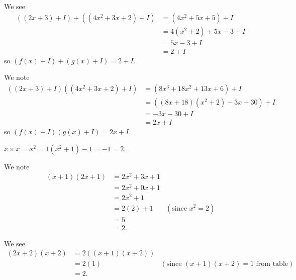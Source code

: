 \begin{questions}
\begin{partquestions}{\roman*}
        \item \begin{partquestions}{\alph*}
            \item We see
            \begin{align*}
                \left((2x+3) + I\right) + \left((4x^2+3x+2) + I\right) &= (4x^2+5x+5) + I\\
                &= 4(x^2+2) + 5x - 3 + I\\
                &= 5x - 3 + I\\
                &= 2 + I
            \end{align*}
            so $(f(x) + I) + (g(x) + I) = 2 + I$.

            \item We note
            \begin{align*}
                ((2x+3) + I)((4x^2+3x+2) + I) &= (8 x^3 + 18 x^2 + 13 x + 6) + I\\
                &= \left((8x + 18)(x^2+2) - 3x - 30\right) + I\\
                &= -3x - 30 + I\\
                &= 2x + I
            \end{align*}
            so $(f(x) + I)(g(x) + I) = 2x + I$.
        \end{partquestions}
    \end{partquestions}

    \item \begin{partquestions}{\alph*}
        \item $x \times x = x^2 = 1(x^2+1) - 1 = -1 = 2$.

        \item We note
        \begin{align*}
            (x+1)(2x+1) &= 2x^2 + 3x + 1\\
            &= 2x^2 + 0x + 1\\
            &= 2x^2 + 1\\
            &= 2(2) + 1 & (\text{since } x^2 = 2)\\
            &= 5\\
            &= 2.
        \end{align*}

        \item We see
        \begin{align*}
            (2x+2)(x+2) &= 2\left((x+1)(x+2)\right)\\
            &= 2(1) & (\text{since } (x+1)(x+2) = 1 \text{ from table})\\
            &= 2.
        \end{align*}


\end{partquestions}
\end{questions}

